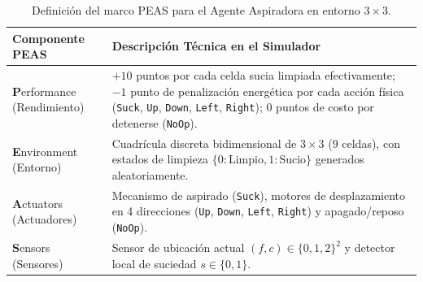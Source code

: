 \documentclass[runningheads]{llncs}
\begin{document}
\begin{table}[htbp]
\centering
\caption{Definición del marco PEAS para el Agente Aspiradora en entorno $3\times 3$.}
\label{tab:peas}
\begin{tabular}{@{}p{3.2cm}p{8.5cm}@{}}
\toprule
\textbf{Componente PEAS} & \textbf{Descripción Técnica en el Simulador} \\ \midrule
\textbf{P}erformance (Rendimiento) & $+10$ puntos por cada celda sucia limpiada efectivamente; $-1$ punto de penalización energética por cada acción física (\texttt{Suck}, \texttt{Up}, \texttt{Down}, \texttt{Left}, \texttt{Right}); $0$ puntos de costo por detenerse (\texttt{NoOp}). \\ \addlinespace
\textbf{E}nvironment (Entorno) & Cuadrícula discreta bidimensional de $3\times 3$ ($9$ celdas), con estados de limpieza $\{0: \text{Limpio}, 1: \text{Sucio}\}$ generados aleatoriamente. \\ \addlinespace
\textbf{A}ctuators (Actuadores) & Mecanismo de aspirado (\texttt{Suck}), motores de desplazamiento en 4 direcciones (\texttt{Up}, \texttt{Down}, \texttt{Left}, \texttt{Right}) y apagado/reposo (\texttt{NoOp}). \\ \addlinespace
\textbf{S}ensors (Sensores) & Sensor de ubicación actual $(f, c) \in \{0,1,2\}^2$ y detector local de suciedad $s \in \{0, 1\}$. \\ \bottomrule
\end{tabular}
\end{table}
\end{document}
